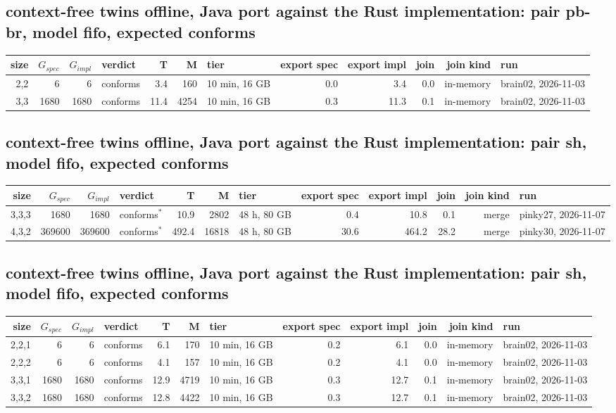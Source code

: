 \documentclass[10pt]{article}
\begin{document}
\subsection*{context-free twins offline, Java port against the Rust implementation: pair \textsf{pb-br}, model fifo, expected conforms}
\begin{longtable}{@{}rrrlrrlrrrrl@{}}
\toprule
size & $G_{\mathit{spec}}$ & $G_{\mathit{impl}}$ & verdict & T & M & tier & export spec & export impl & join & join kind & run \\
\midrule
\endhead
\color{red} 2,2 & 6 & 6 & conforms & 3.4 & 160 & 10 min, 16 GB & 0.0 & 3.4 & 0.0 & in-memory & brain02, 2026-11-03 \\
\color{red} 3,3 & 1680 & 1680 & conforms & 11.4 & 4254 & 10 min, 16 GB & 0.3 & 11.3 & 0.1 & in-memory & brain02, 2026-11-03 \\
\bottomrule
\end{longtable}
\subsection*{context-free twins offline, Java port against the Rust implementation: pair \textsf{sh}, model fifo, expected conforms}
\begin{longtable}{@{}rrrlrrlrrrrl@{}}
\toprule
size & $G_{\mathit{spec}}$ & $G_{\mathit{impl}}$ & verdict & T & M & tier & export spec & export impl & join & join kind & run \\
\midrule
\endhead
\color{red} 3,3,3 & 1680 & 1680 & conforms$^{\ast}$ & 10.9 & 2802 & 48 h, 80 GB & 0.4 & 10.8 & 0.1 & merge & pinky27, 2026-11-07 \\
\color{red} 4,3,2 & 369600 & 369600 & conforms$^{\ast}$ & 492.4 & 16818 & 48 h, 80 GB & 30.6 & 464.2 & 28.2 & merge & pinky30, 2026-11-07 \\
\bottomrule
\end{longtable}
\subsection*{context-free twins offline, Java port against the Rust implementation: pair \textsf{sh}, model fifo, expected conforms}
\begin{longtable}{@{}rrrlrrlrrrrl@{}}
\toprule
size & $G_{\mathit{spec}}$ & $G_{\mathit{impl}}$ & verdict & T & M & tier & export spec & export impl & join & join kind & run \\
\midrule
\endhead
\color{red} 2,2,1 & 6 & 6 & conforms & 6.1 & 170 & 10 min, 16 GB & 0.2 & 6.1 & 0.0 & in-memory & brain02, 2026-11-03 \\
\color{red} 2,2,2 & 6 & 6 & conforms & 4.1 & 157 & 10 min, 16 GB & 0.2 & 4.1 & 0.0 & in-memory & brain02, 2026-11-03 \\
\color{red} 3,3,1 & 1680 & 1680 & conforms & 12.9 & 4719 & 10 min, 16 GB & 0.3 & 12.7 & 0.1 & in-memory & brain02, 2026-11-03 \\
\color{red} 3,3,2 & 1680 & 1680 & conforms & 12.8 & 4422 & 10 min, 16 GB & 0.3 & 12.7 & 0.1 & in-memory & brain02, 2026-11-03 \\
\bottomrule
\end{longtable}
\end{document}
